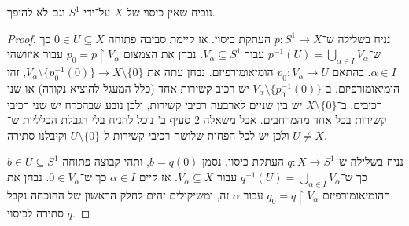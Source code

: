 \subquestion{}
נוכיח שאין כיסוי של $X$ על־ידי $S^1$ וגם לא להיפך.
\begin{proof}
	נניח בשלילה ש־$p : S^1 \to X$ העתקת כיסוי.
	אז קיימת סביבה פתוחה $0 \in U \subseteq X$ כך ש־$p^{-1}(U) = \bigcup_{\alpha \in I} V_{\alpha}$ עבור $V_{\alpha} \subseteq S^1$.
	נבחן את הצמצום $p_0 = p \restriction V_{\alpha}$ עבור איזושהי $\alpha \in I$.
	בהתאם $p_0 : V_{\alpha} \to U$ הומיאומורפיזם.
	נבחן עתה את $V_{\alpha} \setminus \{ p_0^{-1}(0) \} \to X \setminus \{ 0 \}$, זהו הומיאומורפיזם.
	ב־$V_{\alpha} \setminus \{ p_0^{-1}(0) \}$ יש רכיב קשירות אחד (כלל המעגל להוציא נקודה) או שני רכיבים.
	ב־$X \setminus \{ 0 \}$ יש בין שניים לארבעה רכיבי קשירות, ולכן נובע שבהכרח יש שני רכיבי קשירות בכל אחד מהמרחבים.
	אבל משאלה 2 סעיף ב' נוכל להניח בלי הגבלת הכלליות ש־$U \ne X$ ולכן יש לכל הפחות שלושה רכיבי קשירות ל־$U \setminus \{ 0 \}$ וקיבלנו סתירה.

	נניח בשלילה ש־$q : X \to S^1$ העתקת כיסוי.
	נסמן $b = q(0)$, ותהי קבוצה פתוחה $b \in U \subseteq S^1$ כך ש־$q^{-1}(U) = \bigcup_{\alpha \in I} V_{\alpha}$ עבור $V_{\alpha} \subseteq X$.
	אז קיים $\alpha \in I$ כך ש־$0 \in V_{\alpha}$.
	נבחן את ההומיאומורפיזם $q_0 = q \restriction V_{\alpha}$ עבור $\alpha$ זה, ומשיקולים זהים לחלק הראשון של ההוכחה נקבל סתירה לכיסוי $q$.
\end{proof}


